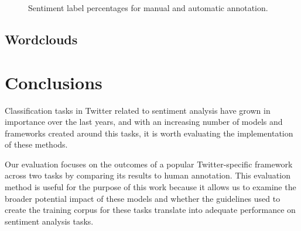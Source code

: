 \documentclass[11pt,a4paper]{article}
\begin{document}
\begin{figure}[ht]
    \centering
    \caption{Sentiment label percentages for manual and automatic annotation.}
    \label{fig:pieplots_emotion}
\end{figure}

\subsection{Wordclouds}

\section{Conclusions}

Classification tasks in Twitter related to sentiment analysis have grown in importance over the last years, and with an increasing number of models and frameworks created around this tasks, it is worth evaluating the implementation of these methods. 

Our evaluation focuses on the outcomes of a popular Twitter-specific framework across two tasks by comparing its results to human annotation. This evaluation method is useful for the purpose of this work because it allows us to examine the broader potential impact of these models and whether the guidelines used to create the training corpus for these tasks translate into adequate performance on sentiment analysis tasks.
\end{document}
